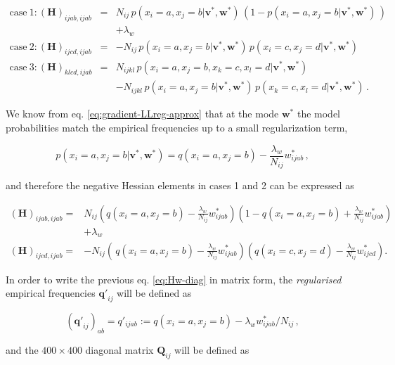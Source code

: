 \documentclass[12pt,a4paper,twoside]{book}
\newcommand{\eq}{\!=\!}
\renewcommand{\H}{\mathbf{H}}
\newcommand{\Qij}{\mathbf{Q}_{ij}}
\newcommand{\qij}{\mathbf{q\prime}_{ij}}
\renewcommand{\v}{\mathbf{v}}
\newcommand{\w}{\mathbf{w}}
\newcommand{\wijab}{w_{ijab}}
\newcommand{\wijcd}{w_{ijcd}}
\theoremstyle{definition}
\theoremstyle{definition}
\theoremstyle{remark}
\begin{document}
\begin{eqnarray}
    \mathrm{case~1:} (\H)_{ijab, ijab}  
    &=&  N_{ij} \, p(x_i \eq a, x_j \eq b| \v^*,\w^*) \, ( 1 - p(x_i \eq a, x_j \eq b| \v^*,\w^*) \,) \\
    &&   + \lambda_w \\
    \mathrm{case~2:} (\H)_{ijcd, ijab}  
    &=&  - N_{ij} \, p(x_i \eq a, x_j \eq b |\v^*,\w^*) \, p(x_i \eq c, x_j \eq d |\v^*,\w^*) \\
    \mathrm{case~3:} (\H)_{klcd, ijab}  
    &=&   N_{ijkl} \, p(x_i \eq a, x_j \eq b, x_k \eq c, x_l \eq d  | \v^*,\w^*) \nonumber \\
    &&    - N_{ijkl} \, p(x_i \eq a, x_j \eq b | \v^*,\w^*)\, p(x_k \eq c, x_l \eq d | \v^*,\w^*) \,.
\label{eq:Hw-offdiag}
\end{eqnarray}

We know from eq. \eqref{eq:gradient-LLreg-approx} that at the mode
\(\w^*\) the model probabilities match the empirical frequencies up to a
small regularization term,

\begin{equation}
    p(x_i \eq a, x_j \eq b | \v^*,\w^*) = q(x_i \eq a, x_j \eq b) - \frac{\lambda_w}{N_{ij}}  \wijab^* \,,
\end{equation}

and therefore the negative Hessian elements in cases 1 and 2 can be
expressed as

\begin{align}
   (\H)_{ijab, ijab} =& N_{ij} \left( q(x_i \eq a, x_j \eq b)  - \frac{\lambda_w}{N_{ij}} \wijab^* \right) \left( 1 - q(x_i \eq a, x_j \eq b) +\frac{\lambda_w}{N_{ij}} \wijab^* \right) \\
   & + \lambda_w \\
   (\H)_{ijcd, ijab} =& -N_{ij} \left(\,q(x_i \eq a, x_j \eq b)  - \frac{\lambda_w}{N_{ij}} \wijab^* \right) \left( q(x_i \eq c, x_j \eq d) -\frac{\lambda_w}{N_{ij}} \wijcd^* \right) .
\label{eq:Hw-diag}
\end{align}

In order to write the previous eq. \eqref{eq:Hw-diag} in matrix form, the
\emph{regularised} empirical frequencies \(\qij\) will be defined as

\begin{equation}
    (\qij)_{ab} = q'_{ijab} := q(x_i \eq a, x_j \eq b) - \lambda_w  \wijab^* / N_{ij} \,,
\end{equation}

and the \(400 \times 400\) diagonal matrix \(\Qij\) will be defined as
\end{document}
